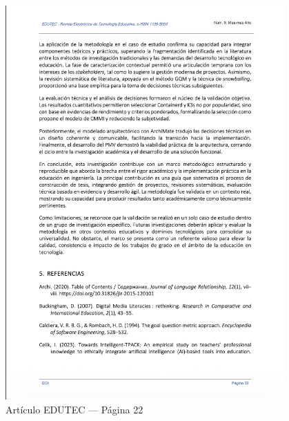 \begin{figure}[H]
    \centering
    \begin{tcolorbox}[
        colback=white,
        colframe=gray!50,
        boxrule=1pt,
        arc=2pt,
        boxsep=5pt,
        left=3pt,
        right=3pt,
        top=3pt,
        bottom=3pt,
        drop shadow
    ]
        \includegraphics[width=0.95\textwidth,keepaspectratio]{apendices/EDUTEC/22.png}
    \end{tcolorbox}
    \caption{Artículo EDUTEC --- Página 22}\label{fig:edutec-pagina-22}
\end{figure}
\FloatBarrier

